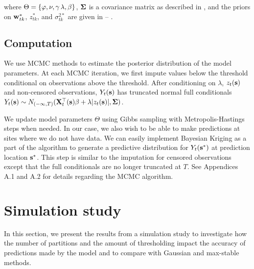 where $\Theta = \{\varphi, \nu, \gamma\, \lambda, \mathbf{\beta}\}$, $\mathbf{\Sigma}$ is a \Matern covariance matrix as described in , and the priors on $\mathbf{w}^*_{tk}$, $z^*_{tk}$, and $\sigma^{2*}_{tk}$ are given in  -- .

\subsection{Computation}\label{sts:comp}
We use MCMC methods to estimate the posterior distribution of the model parameters.
At each MCMC iteration, we first impute values below the threshold conditional on observations above the threshold.
After conditioning on $\lambda$, $z_t(\mathbf{s})$ and non-censored observations, $Y_t(\mathbf{s})$ has truncated normal full conditionals $Y_t(\mathbf{s}) \sim N_{(-\infty, T)}(\mathbf{X}_t^\top(\mathbf{s}) \beta + \lambda | z_t(\mathbf{s})|, \mathbf{\Sigma})$.

We update model parameters $\Theta$ using Gibbs sampling with Metropolis-Hastings steps when needed.
In our case, we also wish to be able to make predictions at sites where we do not have data.
We can easily implement Bayesian Kriging as a part of the algorithm to generate a predictive distribution for $Y_t(\mathbf{s}^*)$ at prediction location $\mathbf{s}^*$.
This step is similar to the imputation for censored observations except that the full conditionals are no longer truncated at $T$.
See Appendices A.1 and A.2 for details regarding the MCMC algorithm.

\section{Simulation study}\label{sts:simstudy}
In this section, we present the results from a simulation study to investigate how the number of partitions and the amount of thresholding impact the accuracy of predictions made by the model and to compare with Gaussian and max-stable methods.

